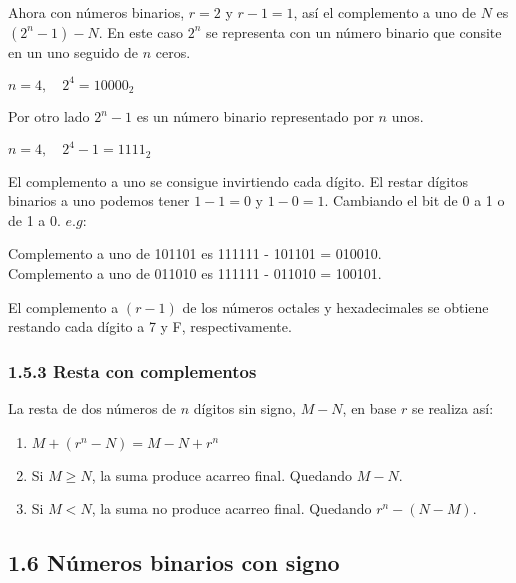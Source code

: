 \documentclass{article}
\begin{document}
Ahora con n\'{u}meros binarios, $r = 2$ y $r - 1 = 1$, as\'{i} el complemento a uno
de $N$ es $(2^n - 1) - N$. En este caso $2^n$ se representa con un n\'{u}mero binario
que consite en un uno seguido de $n$ ceros.
\begin{center}
    $n = 4, \quad 2^4 = 10000_2$
\end{center}

Por otro lado $2^n -1$ es un n\'{u}mero binario representado por $n$ unos.
\begin{center}
    $n = 4, \quad 2^4 - 1 = 1111_2$
\end{center}

El complemento a uno se consigue invirtiendo cada d\'{i}gito. El restar d\'{i}gitos
binarios a uno podemos tener $1 - 1 = 0$ y $1 - 0 = 1$. Cambiando el bit de 0 a 1 o
de 1 a 0. $e.g$:
\begin{center}
    Complemento a uno de 101101 es 111111 - 101101 = 010010. \\
    Complemento a uno de 011010 es 111111 - 011010 = 100101.
\end{center}

El complemento a $(r-1)$ de los números octales y hexadecimales se obtiene
restando cada dígito a 7 y F, respectivamente.

\subsubsection*{1.5.3 Resta con complementos}

La resta de dos n\'{u}meros de $n$ d\'{i}gitos sin signo, $M - N$, en base $r$ se realiza as\'{i}:
\begin{enumerate}
    \item $M + (r^n - N) = M - N + r^n$ 
    \item Si $M \geq N$, la suma produce acarreo final. Quedando $M - N$. 
    \item Si $M < N$, la suma no produce acarreo final. Quedando $r^n - (N - M)$.
\end{enumerate}

\subsection*{1.6 N\'{u}meros binarios con signo}
\end{document}
